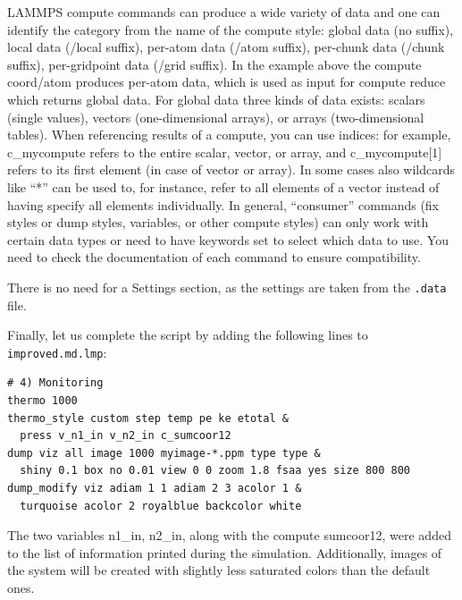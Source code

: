 \documentclass[9pt,tutorial]{livecoms}
\newcommand{\lmpcmd}[1]{\hspace{0pt}\colorbox{listing}{\textcolor{command}{\small{#1}}}\hspace{0pt}} %
\newcommand{\flecmd}[1]{\textcolor{command}{\texttt{#1}}} %
\begin{document}
\begin{note} {\color{blue} LAMMPS \lmpcmd{compute} commands can produce
    a wide variety of data and one can identify the category from the
    name of the compute style: global data (no suffix), local data
    (/local suffix), per-atom data (/atom suffix), per-chunk data
    (/chunk suffix), per-gridpoint data (/grid suffix).  In the example
    above the \lmpcmd{compute coord/atom} produces per-atom data, which
    is used as input for \lmpcmd{compute reduce} which returns global
    data.  For global data three kinds of data exists: scalars (single
    values), vectors (one-dimensional arrays), or arrays
    (two-dimensional tables).  When referencing results of a compute,
    you can use indices: for example, \lmpcmd{c\_mycompute} refers to
    the entire scalar, vector, or array, and \lmpcmd{c\_mycompute[1]}
    refers to its first element (in case of vector or array).  In some
    cases also wildcards like ``*'' can be used to, for instance, refer to all elements
    of a vector instead of having specify all elements individually.
    In general, ``consumer'' commands (fix styles or dump styles,
    variables, or other compute styles) can only work with certain data
    types or need to have keywords set to select which data to use.
    You need to check the documentation of each command to ensure
    compatibility.}
\end{note}

\begin{note}
There is no need for a \lmpcmd{Settings}
section, as the settings are taken from the \flecmd{.data} file.
\end{note}

Finally, let us complete the script by adding the following lines to
\flecmd{improved.md.lmp}:
\begin{lstlisting}
# 4) Monitoring
thermo 1000
thermo_style custom step temp pe ke etotal &
  press v_n1_in v_n2_in c_sumcoor12
dump viz all image 1000 myimage-*.ppm type type &
  shiny 0.1 box no 0.01 view 0 0 zoom 1.8 fsaa yes size 800 800
dump_modify viz adiam 1 1 adiam 2 3 acolor 1 &
  turquoise acolor 2 royalblue backcolor white
\end{lstlisting}
The two variables \lmpcmd{n1\_in}, \lmpcmd{n2\_in}, along with the compute
\lmpcmd{sumcoor12}, were added to the list of information printed during
the simulation.  Additionally, images of the system will be created with
slightly less saturated colors than the default ones.
\end{document}
